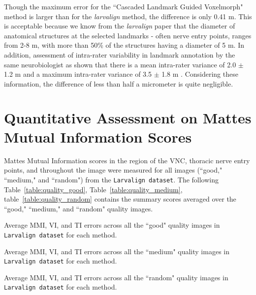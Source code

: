 \documentclass{book}
\begin{document}
	Though the maximum error for the ``Cascaded Landmark Guided Voxelmorph" method is larger than for the \textit{larvalign} method, the difference is only 0.41 \textmu m. This is acceptable because we know from the \textit{larvalign} \cite{larvalign} paper that the diameter of anatomical structures at the selected landmarks - often nerve entry points, ranges from 2-8 \textmu m, with more than 50\% of the structures having a diameter of 5 \textmu m. In addition, assessment of intra-rater variability in landmark annotation by the same neurobiologist as shown that there is a mean intra-rater variance of 2.0 $\pm$ 1.2 \textmu m and a maximum intra-rater variance of 3.5 $\pm$ 1.8 \textmu m \cite{larvalign}. Considering these information, the difference of less than half a micrometer is quite negligible.
	
	\section{Quantitative Assessment on Mattes Mutual Information Scores}
	Mattes Mutual Information scores in the region of the VNC, thoracic nerve entry points, and throughout the image were measured for all images (``good," ``medium," and ``random") from the \texttt{Larvalign dataset}. The following Table~\ref{table:quality_good}, Table~\ref{table:quality_medium}, table~\ref{table:quality_random} contains the summary scores averaged over the ``good," ``medium," and ``random" quality images.
	
	\begin{table}[h!]
		\centering
		
		\caption{Average MMI, VI, and TI errors across all the ``good" quality images in \texttt{Larvalign dataset} for each method.}
		\label{table:quality_good}
	\end{table}
	
	\begin{table}[h!]
		\centering
		
		\caption{Average MMI, VI, and TI errors across all the ``medium" quality images in \texttt{Larvalign dataset} for each method.}
		\label{table:quality_medium}
	\end{table}
	
	\begin{table}[h!]
		\centering
		
		\caption{Average MMI, VI, and TI errors across all the ``random" quality images in \texttt{Larvalign dataset} for each method.}
		\label{table:quality_random}
	\end{table}
\end{document}
